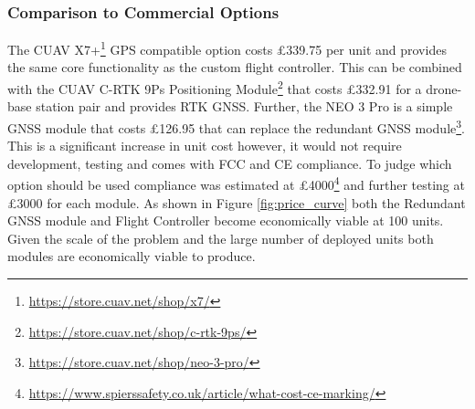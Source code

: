 \subsubsection{Comparison to Commercial Options}\label{sub_sub_section:tgt_commercial_options}

The CUAV X7+\footnote{\url{https://store.cuav.net/shop/x7/}} GPS compatible option costs £339.75 per unit and provides the same core functionality as the custom flight controller. This can be combined with the CUAV C-RTK 9Ps Positioning Module\footnote{\url{https://store.cuav.net/shop/c-rtk-9ps/}} that costs £332.91 for a drone-base station pair and provides \gls{RTK} \gls{GNSS}. Further, the NEO 3 Pro is a simple \gls{GNSS} module that costs £126.95 that can replace the redundant \gls{GNSS} module\footnote{\url{https://store.cuav.net/shop/neo-3-pro/}}. This is a significant increase in unit cost however, it would not require development, testing and comes with FCC and CE compliance. To judge which option should be used compliance was estimated at £4000\footnote{\url{https://www.spierssafety.co.uk/article/what-cost-ce-marking/}} and further testing at £3000 for each module. As shown in Figure \ref{fig:price_curve} both the Redundant \gls{GNSS} module and Flight Controller become economically viable at 100 units. Given the scale of the problem and the large number of deployed units both modules are economically viable to produce.